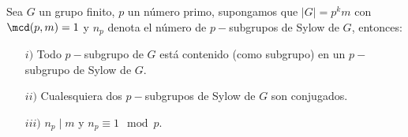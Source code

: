 \begin{teo}
    Sea $G$ un grupo finito, $p$ un número primo, supongamos que $|G| = p^k m$ con $\mcd(p,m) = 1$ y $n_p$ denota el número de $p-$subgrupos de Sylow de $G$, entonces:
    \begin{enumerate}
        \item[$i)$] Todo $p-$subgrupo de $G$ está contenido (como subgrupo) en un $p-$subgrupo de Sylow de $G$.
        \item[$ii)$] Cualesquiera dos $p-$subgrupos de Sylow de $G$ son conjugados.
        \item[$iii)$] $n_p \mid m$ y $n_p \equiv 1 \mod p$. 
    \end{enumerate}
\end{teo}

